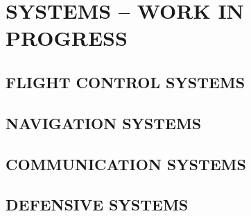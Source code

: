 \chapter{SYSTEMS -- WORK IN PROGRESS}
\localtableofcontents
\cleardoublepage

\section{FLIGHT CONTROL SYSTEMS} 

\clearpage

\section{NAVIGATION SYSTEMS}

\clearpage

\section{COMMUNICATION SYSTEMS}

\clearpage

\section{DEFENSIVE SYSTEMS}

\clearpage

\cleardoublepage